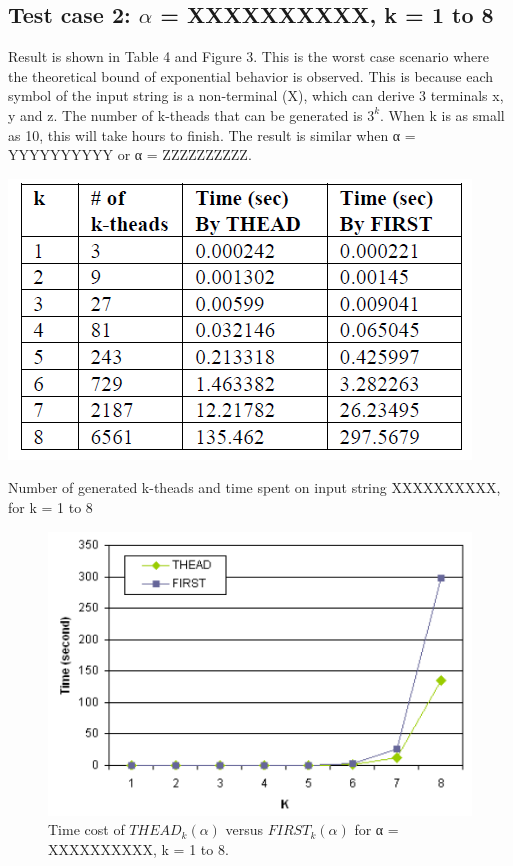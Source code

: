 \documentclass{sig-alternate-05-2015}
\begin{document}
\subsection{Test case 2: $\alpha$ = XXXXXXXXXX, k = 1 to 8}
Result is shown in Table 4 and Figure 3. This is the worst
case scenario where the theoretical bound of exponential
behavior is observed. This is because each symbol of the
input string is a non-terminal (X), which can derive 3 terminals
x, y and z. The number of k-theads that can be generated
is $3^k$. When k is as small as 10, this will take hours to
finish. The result is similar when α = YYYYYYYYYY or
α = ZZZZZZZZZZ.

\begin{table}
\centering
\includegraphics[scale=0.5]{table4.PNG}
\caption{Number of generated k-theads and time spent on
input string XXXXXXXXXX, for k = 1 to 8}
\label{table:4}
\end{table}

\begin{figure}
\centering
\includegraphics[scale=0.5]{figure3.PNG}
\caption{Time cost of $THEAD_k(\alpha)$ versus $FIRST_k(\alpha)$
for α = XXXXXXXXXX, k = 1 to 8.}
\label{fig:3}
\end{figure}
\end{document}
